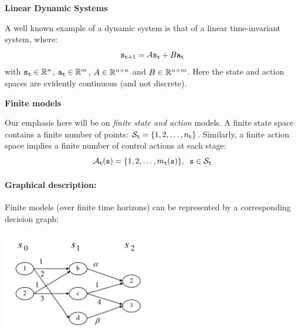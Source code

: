 \begin{example}{\textbf{Linear Dynamic Systems}}

A well known example of a dynamic system is that of a linear
time-invariant system, where:
\[{{\tt s}_{{\tt t} + 1}} = A{{\tt s}_{{\tt t}}} + B{{\tt a}_{{\tt t}}}\]
with ${{\tt s}_{{\tt t}}} \in \mathbb{R}^n$, ${\tt a}_{{\tt t}} \in \mathbb{R}^m$,
$A\in\mathbb{R}^{n\times n}$ and $B\in\mathbb{R}^{n\times m}$. Here the state and
action spaces are evidently continuous (and not discrete).
\end{example}

\begin{example}{\textbf{Finite models}}

Our emphasis here will be on \emph{finite state and action} models.
A finite state space contains a finite number of points:
${\mathcal{S}_{{\tt t}}} = \{ 1,2, \ldots ,{n_{{\tt t}}}\} $. Similarly, a
finite action space implies a finite number of control actions at
each stage:
\[{\mathcal{A}_{{\tt t}}}({\tt s}) = \{ 1,2, \ldots ,{m_{{\tt t}}}({\tt s})\} ,\;\;{\tt s} \in {\mathcal{S}_{{\tt t}}}\]
\end{example}



\paragraph{Graphical description:} Finite models (over finite time horizons) can be represented by a corresponding decision graph:

\begin{centering}
\includegraphics[width=0.5\textwidth]{figures/lecture2_decision_graph.png}\\
\end{centering}


